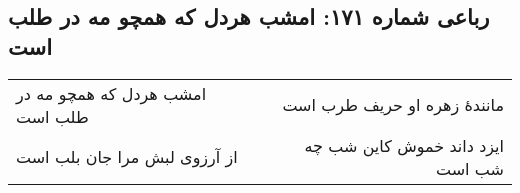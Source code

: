 \begin{center}
\section*{رباعی شماره ۱۷۱: امشب هردل که همچو مه در طلب است}
\label{sec:0171}
\begin{longtable}{l p{0.5cm} r}
امشب هردل که همچو مه در طلب است
&&
مانندهٔ زهره او حریف طرب است
\\
از آرزوی لبش مرا جان بلب است
&&
ایزد داند خموش کاین شب چه شب است
\\
\end{longtable}
\end{center}

